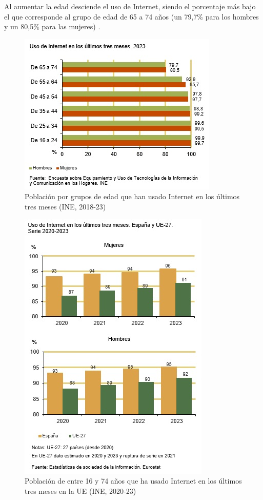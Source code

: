 Al aumentar la edad desciende el uso de Internet, siendo el porcentaje más bajo el que corresponde al grupo de edad de 65 a 74 años (un 79,7\% para los hombres y un 80,5\% para las mujeres) \parencite{intro5}.

\begin{figure}[H]
	\centering
	\includegraphics{imgs/INE-grafica1.jpeg}
	\caption{Población por grupos de edad que han usado Internet en los últimos tres meses (INE, 2018-23)}
	\label{fig:grafica1-INE}
\end{figure}

\begin{figure}[H]
	\centering
	\includegraphics{imgs/INE-grafica2.jpeg}
	\caption{Población de entre 16 y 74 años que ha usado Internet en los últimos tres meses en la UE (INE, 2020-23)}
	\label{fig:grafica2-INE}
\end{figure}

